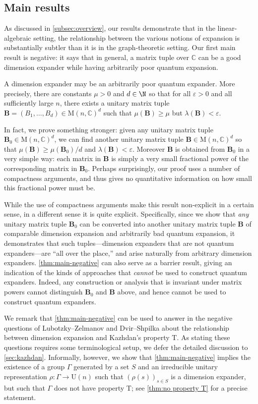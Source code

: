 \documentclass{toc}
\theoremstyle{plain}
\numberwithin{equation}{section}
\theoremstyle{definition}
\newcommand{\bC}{\mathbb{C}}
\newcommand{\M}{\mathrm{M}}
\newcommand{\U}{\mathrm{U}}
\newcommand{\tuple}[1]{\mathbf{#1}}
\newcommand{\vB}{\tuple{B}}
\begin{document}
\subsection{Main results}
As discussed in \cref{subsec:overview}, our results demonstrate that in the linear-algebraic setting, the relationship between the various notions of expansion is substantially subtler than it is in the graph-theoretic setting. Our first main result is negative: it says that in general, a matrix tuple over $\bC$ can be a good dimension expander while having arbitrarily poor quantum expansion. 
\begin{theorem}\label{thm:main-negative}
    A dimension expander may be an arbitrarily poor quantum expander. More precisely,
    there are constants $\mu>0$ and $d \in \N$ so that for all $\varepsilon>0$ and all sufficiently large $n$, there exists a unitary matrix tuple $\vB =(B_1,\dots,B_d) \in \M(n,\bC)^d$ such that $\mu(\vB) \geq \mu$ but $\lambda(\vB) < \varepsilon$.
\end{theorem}
In fact, we prove something stronger: given any unitary matrix tuple $\vB_0 \in \M(n,\bC)^d$, we can find another unitary matrix tuple $\vB \in \M(n,\bC)^d$ so that $\mu(\vB) \geq \mu(\vB_0)/d$ and $\lambda(\vB) < \varepsilon$. Moreover $\vB$ is obtained from $\vB_0$ in a very simple way: each matrix in $\vB$ is simply a very small fractional power of the corresponding matrix in $\vB_0$. Perhaps surprisingly, our proof uses a number of compactness arguments, and thus gives no quantitative information on how small this fractional power must be.

While the use of compactness arguments make this result non-explicit in a certain sense, in a different sense it is quite explicit. 
%
%
Specifically, %
since we show that \emph{any} unitary matrix tuple $\vB_0$ can be converted into another unitary matrix tuple $\vB$ of comparable dimension expansion and arbitrarily bad quantum expansion, it demonstrates that such tuples---dimension expanders that are not quantum expanders---are ``all over the place,'' and arise naturally from arbitrary dimension expanders. \cref{thm:main-negative} can also serve as a barrier result, giving an indication of the kinds of approaches that \emph{cannot} be used to construct quantum expanders. 
%
Indeed, %
any construction or analysis that is invariant under matrix powers cannot distinguish $\vB_0$ and $\vB$ above, and hence cannot be used to construct quantum expanders.
%
%

We remark that \cref{thm:main-negative} can be used to answer in the negative questions of Lubotzky--Zelmanov \cite[Remark/Question 2.5]{LUBOTZKY2008730} and Dvir--Shpilka \cite[Question 1]{DS09} about the relationship between dimension expansion and Kazhdan's property T. As stating these questions requires some terminological setup, we defer the detailed discussion to \cref{sec:kazhdan}. Informally, however, we show that \cref{thm:main-negative} implies the existence of a group $\Gamma$ generated by a set $S$ and an irreducible unitary representation $\rho:\Gamma \to \U(n)$ such that $(\rho(s))_{s \in S}$ is a dimension expander, but such that $\Gamma$ does not have property T; see \cref{thm:no property T} for a precise statement.
\end{document}
